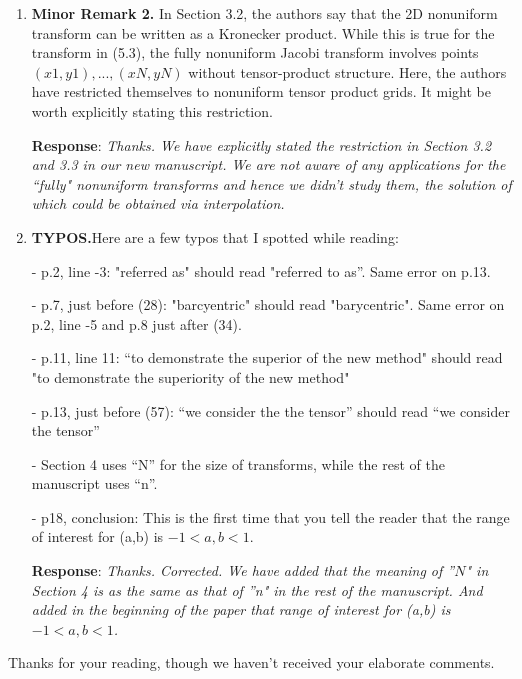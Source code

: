 \documentclass[11pt]{article}
\newcommand{\Response}{{\bf Response}}
\begin{document}
\begin{enumerate}
\Response: {\it Thanks for mentioning the observation in related papers. We have cited and discussed this paper on Page 2.  \color{red}{James, do you know this WJ inversion?}.} 


\item \textbf{Minor Remark 2.} In Section 3.2, the authors say that the 2D nonuniform transform can be written as a Kronecker product. While
this is true for the transform in (5.3), the fully nonuniform Jacobi transform involves points $(x1,y1),...,(xN,yN)$ without tensor-product
structure. Here, the authors have restricted themselves to nonuniform tensor product grids. It might be worth explicitly stating this
restriction.

\Response: {\it Thanks. We have explicitly stated the restriction in Section 3.2 and 3.3 in our new manuscript. We are not aware of any applications for the ``fully" nonuniform transforms and hence we didn't study them, the solution of which could be obtained via interpolation.} 

\item \textbf{TYPOS.}Here are a few typos that I spotted while reading:

- p.2, line -3: "referred as" should read "referred to as”. Same error on p.13.

- p.7, just before (28): "barcyentric" should read "barycentric". Same error on p.2, line -5 and p.8 just after (34).

- p.11, line 11: “to demonstrate the superior of the new method" should read "to demonstrate the superiority of the new method"

- p.13, just before (57): “we consider the the tensor” should read “we consider the tensor”

- Section 4 uses “N” for the size of transforms, while the rest of the manuscript uses “n”.

- p18, conclusion: This is the first time that you tell the reader that the range of interest for (a,b) is $-1<a,b<1$.

\Response: {\it Thanks. Corrected. We have added that the meaning of ''$N$" in Section 4 is as the same as that of ''n" in the rest of the manuscript. And added in the beginning of the paper that range of interest for (a,b) is $-1<a,b<1$. }

\end{enumerate}


\vspace{0.5in}

 Thanks for your reading, though we haven't received your elaborate comments.
\end{document}
